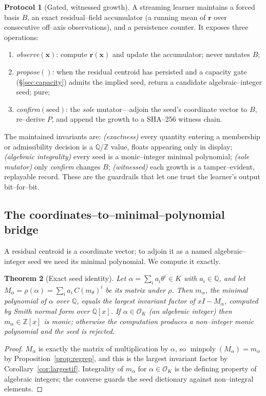 \documentclass[11pt]{article}
\theoremstyle{plain}
\newtheorem{theorem}{Theorem}[section]
\theoremstyle{definition}
\newtheorem{protocol}[theorem]{Protocol}
\theoremstyle{remark}
\newcommand{\Q}{\mathbb{Q}}
\newcommand{\Z}{\mathbb{Z}}
\newcommand{\K}{K}
\newcommand{\OK}{\mathcal{O}_K}
\newcommand{\minpoly}{\operatorname{minpoly}}
\newcommand{\rr}{\mathbf{r}}
\newcommand{\xx}{\mathbf{x}}
\newcommand{\BB}{B}
\begin{document}
\begin{protocol}[Gated, witnessed growth]\label{prot:growth}
A streaming learner maintains a forced basis $\BB$, an exact residual--field accumulator (a running mean of
$\rr$ over consecutive off--axis observations), and a persistence counter. It exposes three operations:
\begin{enumerate}[label=(\alph*),leftmargin=*]
  \item \emph{observe}$(\xx)$: compute $\rr(\xx)$ and update the accumulator; never mutates $\BB$;
  \item \emph{propose}$()$: when the residual centroid has persisted and a capacity gate
        (\S\ref{sec:capacity}) admits the implied seed, return a candidate algebraic--integer seed; pure;
  \item \emph{confirm}$(\text{seed})$: the \emph{sole} mutator---adjoin the seed's coordinate vector to
        $\BB$, re--derive $P$, and append the growth to a SHA--256 witness chain.
\end{enumerate}
\end{protocol}

The maintained invariants are: \emph{(exactness)} every quantity entering a membership or admissibility
decision is a $\Q$/$\Z$ value, floats appearing only in display; \emph{(algebraic integrality)} every seed
is a monic--integer minimal polynomial; \emph{(sole mutator)} only \emph{confirm} changes $\BB$;
\emph{(witnessed)} each growth is a tamper--evident, replayable record. These are the guardrails that let one
trust the learner's output bit--for--bit.

\subsection{The coordinates--to--minimal--polynomial bridge}\label{subsec:bridge}
A residual centroid is a coordinate vector; to adjoin it as a named algebraic--integer seed we need its
minimal polynomial. We compute it exactly.

\begin{theorem}[Exact seed identity]\label{thm:bridge}
Let $\alpha=\sum_i a_i\theta^{i}\in\K$ with $a_i\in\Q$, and let
$M_\alpha=\rho(\alpha)=\sum_i a_i\,C(m_\theta)^{i}$ be its matrix under $\rho$. Then $m_\alpha$,
the minimal polynomial of $\alpha$ over $\Q$, equals the largest invariant factor of $xI-M_\alpha$, computed
by Smith normal form over $\Q[x]$. If $\alpha\in\OK$ (an algebraic integer) then $m_\alpha\in\Z[x]$ is monic;
otherwise the computation produces a non--integer monic polynomial and the seed is rejected.
\end{theorem}
\begin{proof}
$M_\alpha$ is exactly the matrix of multiplication by $\alpha$, so $\minpoly(M_\alpha)=m_\alpha$ by
Proposition~\ref{prop:regrep}, and this is the largest invariant factor by Corollary~\ref{cor:largestif}.
Integrality of $m_\alpha$ for $\alpha\in\OK$ is the defining property of algebraic integers; the converse
guards the seed dictionary against non--integral elements.
\end{proof}
\end{document}
